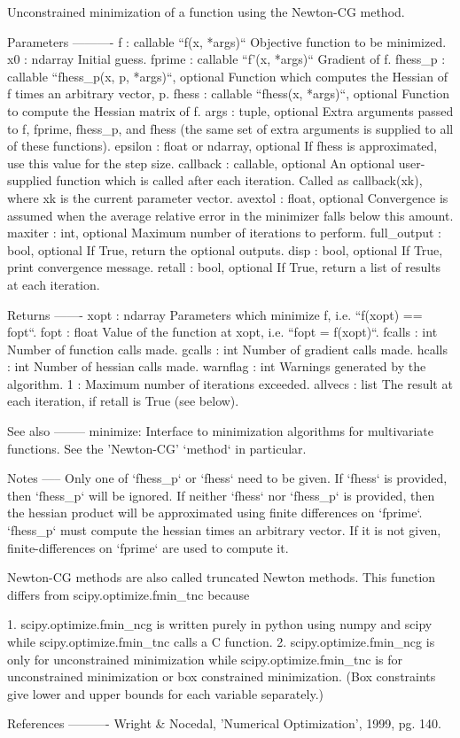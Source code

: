 \begin{DoxyVerb}Unconstrained minimization of a function using the Newton-CG method.

Parameters
----------
f : callable ``f(x, *args)``
    Objective function to be minimized.
x0 : ndarray
    Initial guess.
fprime : callable ``f'(x, *args)``
    Gradient of f.
fhess_p : callable ``fhess_p(x, p, *args)``, optional
    Function which computes the Hessian of f times an
    arbitrary vector, p.
fhess : callable ``fhess(x, *args)``, optional
    Function to compute the Hessian matrix of f.
args : tuple, optional
    Extra arguments passed to f, fprime, fhess_p, and fhess
    (the same set of extra arguments is supplied to all of
    these functions).
epsilon : float or ndarray, optional
    If fhess is approximated, use this value for the step size.
callback : callable, optional
    An optional user-supplied function which is called after
    each iteration.  Called as callback(xk), where xk is the
    current parameter vector.
avextol : float, optional
    Convergence is assumed when the average relative error in
    the minimizer falls below this amount.
maxiter : int, optional
    Maximum number of iterations to perform.
full_output : bool, optional
    If True, return the optional outputs.
disp : bool, optional
    If True, print convergence message.
retall : bool, optional
    If True, return a list of results at each iteration.

Returns
-------
xopt : ndarray
    Parameters which minimize f, i.e. ``f(xopt) == fopt``.
fopt : float
    Value of the function at xopt, i.e. ``fopt = f(xopt)``.
fcalls : int
    Number of function calls made.
gcalls : int
    Number of gradient calls made.
hcalls : int
    Number of hessian calls made.
warnflag : int
    Warnings generated by the algorithm.
    1 : Maximum number of iterations exceeded.
allvecs : list
    The result at each iteration, if retall is True (see below).

See also
--------
minimize: Interface to minimization algorithms for multivariate
    functions. See the 'Newton-CG' `method` in particular.

Notes
-----
Only one of `fhess_p` or `fhess` need to be given.  If `fhess`
is provided, then `fhess_p` will be ignored.  If neither `fhess`
nor `fhess_p` is provided, then the hessian product will be
approximated using finite differences on `fprime`. `fhess_p`
must compute the hessian times an arbitrary vector. If it is not
given, finite-differences on `fprime` are used to compute
it.

Newton-CG methods are also called truncated Newton methods. This
function differs from scipy.optimize.fmin_tnc because

1. scipy.optimize.fmin_ncg is written purely in python using numpy
    and scipy while scipy.optimize.fmin_tnc calls a C function.
2. scipy.optimize.fmin_ncg is only for unconstrained minimization
    while scipy.optimize.fmin_tnc is for unconstrained minimization
    or box constrained minimization. (Box constraints give
    lower and upper bounds for each variable separately.)

References
----------
Wright & Nocedal, 'Numerical Optimization', 1999, pg. 140.\end{DoxyVerb}
